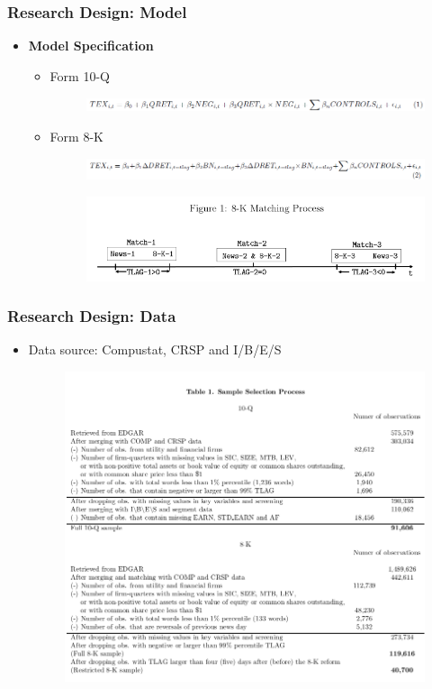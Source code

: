 \documentclass{beamer}
\begin{document}
\begin{frame}
	\frametitle{Research Design: Model}
	\begin{itemize}

\item \textbf{Model Specification}
	\begin{itemize}
		\item Form 10-Q
		
		\begin{figure}[h]
			\centering
			\includegraphics[width=0.75\linewidth]{eq1}
			\label{eq1}
		\end{figure}
	
		\item Form 8-K
		
		\begin{figure}[h]
			\centering
			\includegraphics[width=0.8\linewidth]{eq2}
			\label{eq2}
		\end{figure}
	
		\begin{figure}[h]
			\centering
			\includegraphics[width=0.6\linewidth]{fig1}
			\label{fig1}
		\end{figure}
	\end{itemize}

\end{itemize}
\end{frame}
\begin{frame}
\frametitle{Research Design: Data}

\begin{itemize}
	\item Data source: Compustat, CRSP and I/B/E/S
	
	\begin{figure}[h]
		\centering
		\includegraphics[width=0.65\linewidth]{tab1}
		\label{tab1}
	\end{figure}

\end{itemize}
\end{frame}
\end{document}
